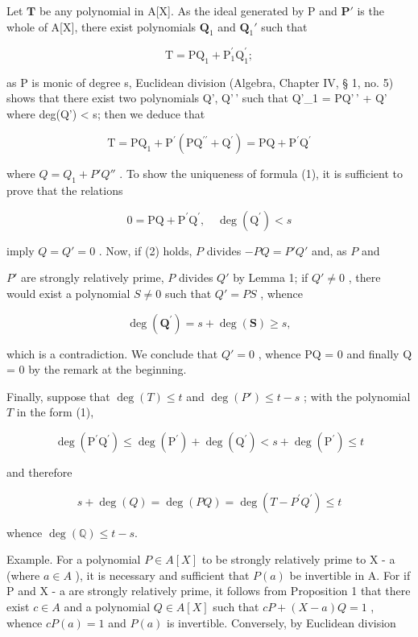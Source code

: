 Let \(\mathbf{T}\) be any polynomial in A{[}X{]}. As the ideal generated by P and \(\mathbf{P}'\) is the whole of A{[}X{]}, there exist polynomials \(\mathbf{Q}_1\) and \(\mathbf{Q}_1'\) such that

\[
\mathrm{T} = \mathrm{PQ} _ {1} + \mathrm{P} _ {1} ^ {\prime} \mathrm{Q} _ {1} ^ {\prime};
\]

as P is monic of degree s, Euclidean division (Algebra, Chapter IV, § 1, no. 5) shows that there exist two polynomials Q', Q'\,' such that Q'\_1 = PQ'\,' + Q' where deg(Q') \textless{} s; then we deduce that

\[
\mathrm{T} = \mathrm{PQ} _ {1} + \mathrm{P} ^ {\prime} (\mathrm{PQ} ^ {\prime \prime} + \mathrm{Q} ^ {\prime}) = \mathrm{PQ} + \mathrm{P} ^ {\prime} \mathrm{Q} ^ {\prime}
\]

where \(Q = Q_{1} + P'Q''\) . To show the uniqueness of formula (1), it is sufficient to prove that the relations

\[
0 = \mathrm{PQ} + \mathrm{P} ^ {\prime} \mathrm{Q} ^ {\prime}, \quad \deg (\mathrm{Q} ^ {\prime}) <   s\tag{2}
\]

imply \(Q = Q' = 0\) . Now, if (2) holds, \(P\) divides \(-PQ = P'Q'\) and, as \(P\) and

\(P'\) are strongly relatively prime, \(P\) divides \(Q'\) by Lemma 1; if \(Q' \neq 0\) , there would exist a polynomial \(S \neq 0\) such that \(Q' = PS\) , whence

\[
\deg (\mathbf {Q} ^ {\prime}) = s + \deg (\mathbf {S}) \geqslant s,
\]

which is a contradiction. We conclude that \(Q' = 0\) , whence PQ = 0 and finally Q = 0 by the remark at the beginning.

Finally, suppose that \(\deg(T) \leqslant t\) and \(\deg(P') \leqslant t - s\) ; with the polynomial \(T\) in the form (1),

\[
\deg (\mathrm{P} ^ {\prime} \mathrm{Q} ^ {\prime}) \leqslant \deg (\mathrm{P} ^ {\prime}) + \deg (\mathrm{Q} ^ {\prime}) <   s + \deg (\mathrm{P} ^ {\prime}) \leqslant t
\]

and therefore

\[
s + \deg (Q) = \deg (P Q) = \deg (T - P ^ {\prime} Q ^ {\prime}) \leqslant t
\]

whence \(\deg (\mathbb{Q})\leqslant t - s.\)

Example. For a polynomial \(P \in A[X]\) to be strongly relatively prime to X - a (where \(a \in A\) ), it is necessary and sufficient that \(P(a)\) be invertible in A. For if P and X - a are strongly relatively prime, it follows from Proposition 1 that there exist \(c \in A\) and a polynomial \(Q \in A[X]\) such that \(cP + (X - a)Q = 1\) , whence \(cP(a) = 1\) and \(P(a)\) is invertible. Conversely, by Euclidean division

